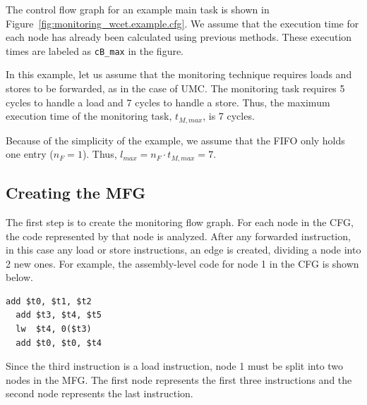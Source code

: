 The control flow graph for an example main task is shown in Figure~\ref{fig:monitoring_wcet.example.cfg}. We assume
that the execution time for each node has already been calculated using
previous methods. These execution times are labeled as {\tt cB\_max} in the figure.

In this example, let us assume that the monitoring technique requires loads and stores 
to be forwarded, as
in the case of UMC. The monitoring task requires 5 cycles to handle a load and
7 cycles to handle a store. Thus, the maximum execution time of the monitoring
task, $t_{M, max}$, is 7 cycles.

Because of the simplicity of the example, we assume that the FIFO only holds one entry ($n_F = 1$). Thus, $l_{max} = n_F \cdot t_{M, max} = 7$.

\subsection{Creating the MFG}

The first step is to create the monitoring flow graph. For each node in the
CFG, the code represented by that node is analyzed. After any forwarded
instruction, in this case any load or store instructions, an edge is created,
dividing a node into 2 new ones.
For example, the assembly-level code for node 1 in the CFG is shown below.
\vspace{-0.2in}
\lstset{numbers=left, 
  firstnumber=1, 
  xleftmargin=2em, 
  numbersep=1em, 
  basicstyle=\ttfamily, 
  title=node 1, 
  } 
\begin{lstlisting}[frame=tb]
  add $t0, $t1, $t2
  add $t3, $t4, $t5
  lw  $t4, 0($t3)
  add $t0, $t0, $t4
\end{lstlisting}
Since the third instruction is a load instruction, node 1 must be split into
two nodes in the MFG. The first node represents the first three instructions and
the second node represents the last instruction. 

